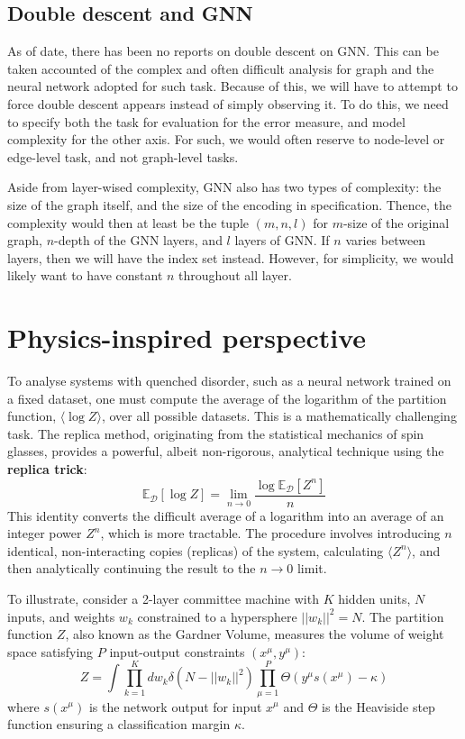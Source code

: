 \documentclass[10pt,oneside,oldfontcommands,dvipsnames,article]{memoir}
\begin{document}
\subsection{Double descent and GNN}

As of date, there has been no reports on double descent on GNN. This can be taken accounted of the complex and often difficult analysis for graph and the neural network adopted for such task. Because of this, we will have to attempt to force double descent appears instead of simply observing it. To do this, we need to specify both the task for evaluation for the error measure, and model complexity for the other axis. For such, we would often reserve to node-level or edge-level task, and not graph-level tasks. 

Aside from layer-wised complexity, GNN also has two types of complexity: the size of the graph itself, and the size of the encoding in specification. Thence, the complexity would then at least be the tuple $(m,n,l)$ for $m$-size of the original graph, $n$-depth of the GNN layers, and $l$ layers of GNN. If $n$ varies between layers, then we will have the index set instead. However, for simplicity, we would likely want to have constant $n$ throughout all layer. 

\clearpage
\section{Physics-inspired perspective}
To analyse systems with quenched disorder, such as a neural network trained on a fixed dataset, one must compute the average of the logarithm of the partition function, $\langle\log Z\rangle$, over all possible datasets. This is a mathematically challenging task. The replica method, originating from the statistical mechanics of spin glasses, provides a powerful, albeit non-rigorous, analytical technique using the \textbf{replica trick}:
\begin{equation}
    \mathbb{E}_{\mathcal{D}}[\log Z] = \lim_{n \to 0} \frac{\log \mathbb{E}_{\mathcal{D}}[Z^n]}{n}
\end{equation}
This identity converts the difficult average of a logarithm into an average of an integer power $Z^n$, which is more tractable. The procedure involves introducing $n$ identical, non-interacting copies (replicas) of the system, calculating $\langle Z^n \rangle$, and then analytically continuing the result to the $n \to 0$ limit.

To illustrate, consider a 2-layer committee machine with $K$ hidden units, $N$ inputs, and weights $w_k$ constrained to a hypersphere $||w_k||^2 = N$. The partition function $Z$, also known as the Gardner Volume, measures the volume of weight space satisfying $P$ input-output constraints $(x^\mu, y^\mu)$:
\begin{equation}
    Z = \int \prod_{k=1}^{K} dw_k \delta(N - ||w_k||^2) \prod_{\mu=1}^{P} \Theta(y^\mu s(x^\mu) - \kappa)
\end{equation}
where $s(x^\mu)$ is the network output for input $x^\mu$ and $\Theta$ is the Heaviside step function ensuring a classification margin $\kappa$.
\end{document}
